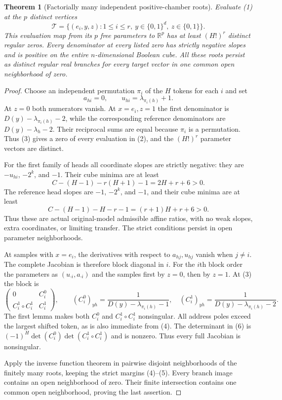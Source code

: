 \documentclass[11pt]{article}
\newtheorem{theorem}{Theorem}
\begin{document}
\begin{theorem}[Factorially many independent positive-chamber roots]
Evaluate (1) at the $p$ distinct vertices
\[
 \mathcal T=\{(e_i,y,z):1\leq i\leq r,\ y\in\{0,1\}^d,\
                                               z\in\{0,1\}\}.
 \tag{2}
\]
This evaluation map from its $p$ free parameters to $\mathbb R^p$
has at least $(H!)^r$ distinct regular zeros. Every denominator at
every listed zero has strictly negative slopes and is positive on
the entire $n$-dimensional Boolean cube. All these roots persist as
distinct regular real branches for every target vector in one common
open neighborhood of zero.
\end{theorem}
\begin{proof}
Choose an independent permutation $\pi_i$ of the $H$ tokens for each
$i$ and set
\[
             a_{hi}=0,\qquad u_{hi}=\lambda_{\pi_i(h)}+1.
 \tag{3}
\]
At $z=0$ both numerators vanish. At $x=e_i,z=1$ the first denominator
is $D(y)-\lambda_{\pi_i(h)}-2$, while the corresponding reference
denominators are $D(y)-\lambda_h-2$. Their reciprocal sums are equal
because $\pi_i$ is a permutation. Thus (3) gives a zero of every
evaluation in (2), and the $(H!)^r$ parameter vectors are distinct.

For the first family of heads all coordinate slopes are strictly
negative: they are $-u_{hi}$, $-2^k$, and $-1$. Their cube minima
are at least
\[
 C-(H-1)-r(H+1)-1=2H+r+6>0.
 \tag{4}
\]
The reference head slopes are $-1$, $-2^k$, and $-1$, and their
cube minima are at least
\[
 C-(H-1)-H-r-1=(r+1)H+r+6>0.
 \tag{5}
\]
Thus these are actual original-model admissible affine ratios,
with no weak slopes, extra coordinates, or limiting transfer.
The strict conditions persist in open parameter neighborhoods.

At samples with $x=e_i$, the derivatives with respect to
$a_{hj},u_{hj}$ vanish when $j\ne i$. The complete Jacobian is
therefore block diagonal in $i$. For the $i$th block order the
parameters as $(u_{\cdot i},a_{\cdot i})$ and the samples first by
$z=0$, then by $z=1$. At (3) the block is
\[
 \begin{pmatrix}
  0 & C_i^0\\
  C_i^1\circ C_i^1 & C_i^1
 \end{pmatrix},
 \qquad
 (C_i^0)_{yh}=\frac1{D(y)-\lambda_{\pi_i(h)}-1},
 \quad
 (C_i^1)_{yh}=\frac1{D(y)-\lambda_{\pi_i(h)}-2}.
 \tag{6}
\]
The first lemma makes both $C_i^0$ and $C_i^1\circ C_i^1$
nonsingular. All address poles exceed the largest shifted token,
as is also immediate from (4). The determinant in (6) is
$(-1)^H\det(C_i^0)\det(C_i^1\circ C_i^1)$ and is nonzero.
Thus every full Jacobian is nonsingular.

Apply the inverse function theorem in pairwise disjoint neighborhoods
of the finitely many roots, keeping the strict margins (4)--(5).
Every branch image contains an open neighborhood of zero. Their
finite intersection contains one common open neighborhood, proving
the last assertion.
\end{proof}
\end{document}
